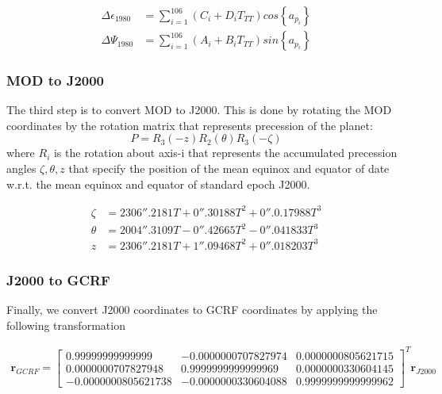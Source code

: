 \documentclass[12pt,letterpaper]{paper}
\begin{document}
\begin{align}
\Delta \epsilon_{1980} &= \sum_{i=1}^{106} (C_i + D_i T_{TT})cos\left\lbrace{a_{p_i}}\right\rbrace \\
\Delta \Psi_{1980} &= \sum_{i=1}^{106} (A_i + B_i T_{TT})sin\left\lbrace{a_{p_i}}\right\rbrace
\end{align}



\subsubsection{MOD to J2000}
The third step is to convert MOD to J2000. This is done by rotating the MOD coordinates by the rotation matrix that represents precession of the planet:
\begin{equation}
P = R_3(-z)R_2(\theta)R_3(-\zeta)
\end{equation}
where $R_i$ is the rotation about axis-i that represents the accumulated precession angles $\zeta, \theta, z$ that specify the position of the mean equinox and equator of date w.r.t. the mean equinox and equator of standard epoch J2000.

\begin{align}
\zeta &= 2306''.2181T + 0''.30188T^2 + 0''.0.17988T^3\\
\theta &= 2004''.3109T - 0''.42665T^2 - 0''.041833T^3\\
z &= 2306''.2181T + 1''.09468T^2 + 0''.018203T^3
\end{align}


\subsubsection{J2000 to GCRF}
Finally, we convert J2000 coordinates to GCRF coordinates by applying the following transformation

\begin{align}
\mathbf{r}_{GCRF} =  \begin{bmatrix}
        0.99999999999999 & -0.0000000707827974 & 0.0000000805621715 \\
        0.0000000707827948 & 0.9999999999999969 & 0.0000000330604145 \\
        -0.0000000805621738 & -0.0000000330604088 & 0.9999999999999962
     \end{bmatrix}^T \mathbf{r}_{J2000}
\end{align}
\end{document}
